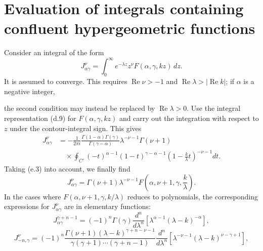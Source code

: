 \renewcommand{\thesection}{\alph{section}}
\setcounter{section}{5}
\section{Evaluation of integrals containing confluent hypergeometric functions}

Consider an integral of the form
\begin{equation}
 J_{\alpha\gamma}^{\nu}=\int_0^\infty
 e^{-\lambda z}z^\nu F(\alpha,\gamma,kz)\,dz.
 \tag{f.1}
\end{equation}
It is assumed to converge. This requires
$\operatorname{Re}\nu>-1$ and $\operatorname{Re}\lambda>|\operatorname{Re}k|$;
if $\alpha$ is a negative integer,

the second condition may instead be replaced by
$\operatorname{Re}\lambda>0$. Use the integral representation (d.9) for
$F(\alpha,\gamma,kz)$ and carry out the integration with respect to $z$ under
the contour-integral sign. This gives
\[
 \begin{split}
 J_{\alpha\gamma}^{\nu}
 &=-\frac1{2\pi i}\frac{\Gamma(1-\alpha)\Gamma(\gamma)}
 {\Gamma(\gamma-\alpha)}\lambda^{-\nu-1}\Gamma(\nu+1)\\
 &\hspace{1em}\times\oint_{C'}(-t)^{\alpha-1}(1-t)^{\gamma-\alpha-1}
 \left(1-\frac{k}{\lambda}t\right)^{-\nu-1}dt.
 \end{split}
\]
Taking (e.3) into account, we finally find
\begin{equation}
 J_{\alpha\gamma}^{\nu}=\Gamma(\nu+1)\lambda^{-\nu-1}
 F\left(\alpha,\nu+1,\gamma,\frac{k}{\lambda}\right).
 \tag{f.2}
\end{equation}
In the cases where $F(\alpha,\nu+1,\gamma,k/\lambda)$ reduces to
polynomials, the corresponding expressions for
$J_{\alpha\gamma}^{\nu}$ are in elementary functions:
\begin{equation}
 J_{\alpha\gamma}^{\gamma+n-1}=(-1)^n\Gamma(\gamma)
 \frac{d^n}{d\lambda^n}
 \left[\lambda^{\alpha-1}(\lambda-k)^{-\alpha}\right],
 \tag{f.3}
\end{equation}
\begin{equation}
 J_{-n,\gamma}^{\nu}=(-1)^n
 \frac{\Gamma(\nu+1)(\lambda-k)^{\gamma+n-\nu-1}}
 {\gamma(\gamma+1)\cdots(\gamma+n-1)}
 \frac{d^n}{d\lambda^n}
 \left[\lambda^{-\nu-1}(\lambda-k)^{\nu-\gamma+1}\right],
 \tag{f.4}
\end{equation}
